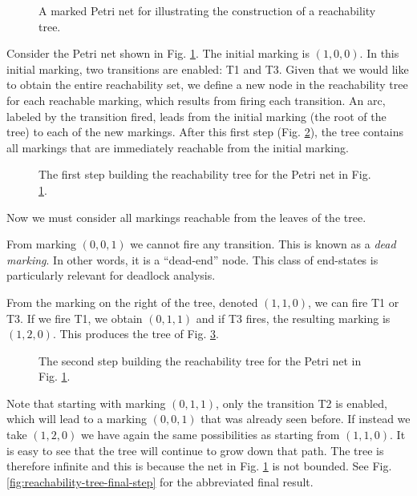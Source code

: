 \begin{figure}[!htb]
      \centering
      
      \caption{A marked Petri net for illustrating the construction of a reachability tree.}
      \label{fig:reachability-tree-example}
\end{figure}

Consider the Petri net shown in Fig. \ref{fig:reachability-tree-example}.
The initial marking is $(1, 0, 0)$.
In this initial marking, two transitions are enabled: T1 and T3.
Given that we would like to obtain the entire reachability set,
we define a new node in the reachability tree for each reachable marking,
which results from firing each transition.
An arc, labeled by the transition fired, leads from the initial marking
(the root of the tree) to each of the new markings.
After this first step (Fig. \ref{fig:reachability-tree-step-1}),
the tree contains all markings that are immediately reachable from the initial marking.

\begin{figure}[!htb]
      \centering
      
      \caption{The first step building the reachability tree
            for the Petri net in Fig. \ref{fig:reachability-tree-example}.}
      \label{fig:reachability-tree-step-1}
\end{figure}

Now we must consider all markings reachable from the leaves of the tree.

From marking $(0,0,1)$ we cannot fire any transition.
This is known as a \emph{dead marking}.
In other words, it is a ``dead-end'' node.
This class of end-states is particularly relevant for deadlock analysis.

From the marking on the right of the tree, denoted $(1, 1, 0)$, we can fire T1 or T3.
If we fire T1, we obtain $(0, 1, 1)$ and if T3 fires, the resulting marking is $(1, 2, 0)$.
This produces the tree of Fig. \ref{fig:reachability-tree-step-2}.

\begin{figure}[!htb]
      \centering
      
      \caption{The second step building the reachability tree
            for the Petri net in Fig. \ref{fig:reachability-tree-example}.}
      \label{fig:reachability-tree-step-2}
\end{figure}

Note that starting with marking $(0, 1, 1)$, only the transition T2 is enabled,
which will lead to a marking $(0, 0, 1)$ that was already seen before.
If instead we take $(1, 2, 0)$ we have again the same possibilities as starting from $(1, 1, 0)$.
It is easy to see that the tree will continue to grow down that path.
The tree is therefore infinite and this is because
the net in Fig. \ref{fig:reachability-tree-example} is not bounded.
See Fig. \ref{fig:reachability-tree-final-step} for the abbreviated final result.

